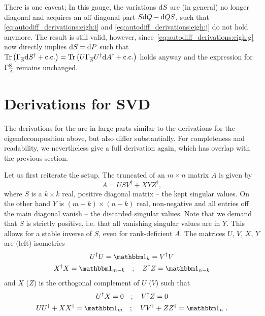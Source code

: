 There is one caveat;
%
In this gauge, the variations $\mathrm{d}{S}$ are (in general) no longer diagonal and acquires an off-diagonal part $S \mathrm{d}{Q} - \mathrm{d}{Q} S$, such that \eqref{eq:autodiff_derivations:eigh:i} and \eqref{eq:autodiff_derivations:eigh:j} do not hold anymore.
%
The result is still valid, however, since~\eqref{eq:autodiff_derivations:eigh:g} now directly implies $\mathrm{d}{S} = \mathrm{d}{P}$ such that $\mathrm{Tr}\left( {\Gamma_{\overline{S}} \mathrm{d}{S}^\dagger + \mathrm{c.c.}} \right) = \mathrm{Tr}\left( {U \Gamma_{\overline{S}} U^\dagger \mathrm{d}{A}^\dagger + \mathrm{c.c.}} \right)$ holds anyway and the expression for $\Gamma_{\overline{A}}^\mathrm{S}$ remains unchanged.

\section{Derivations for SVD}
\label{sec:autodiff_derivation:svd}

The derivations for the  are in large parts similar to the derivations for the eigendecomposition above, but also differ substantially.
%
For completeness and readability, we nevertheless give a full derivation again, which has overlap with the previous section.

Let us first reiterate the setup.
%
The truncated  of an $m \times n$ matrix $A$ is given by
\begin{equation}
    A = U S V^{\dagger} + X Y Z^{\dagger},
    \label{eq:autodiff_derivations:svd_full_decomposition}
\end{equation}
%
where $S$ is a $k \times k$ real, positive diagonal matrix -- the kept singular values.
%
On the other hand $Y$ is $(m - k) \times (n - k)$ real, non-negative and all entries off the main diagonal vanish -- the discarded singular values.
%
Note that we demand that $S$ is strictly positive, i.e. that all vanishing singular values are in $Y$.
%
This allows for a stable inverse of $S$, even for rank-deficient $A$.
%
The matrices $U$, $V$, $X$, $Y$ are (left) isometries
%
\begin{equation}\begin{gathered}
    U^{\dagger} U = \eye_k = V^{\dagger} V
    \\
    X^{\dagger} X = \eye_{m-k}
    \quad ; \quad
    Z^{\dagger} Z = \eye_{n-k}
    \label{eq:autodiff_derivations:isometric_constraints}
\end{gathered}\end{equation}
%
and $X$ ($Z$) is the orthogonal complement of $U$ ($V$) such that
%
\begin{gather}
    U^{\dagger} X = 0
    \quad ; \quad
    V^{\dagger} Z = 0
    \label{eq:autodiff_derivations:UX_VZ_ortho}
    \\
    U U^{\dagger} + X X^{\dagger} = \eye_m
    \quad ; \quad
    V V^{\dagger} + Z Z^{\dagger} = \eye_n
    ~.
    \label{eq:autodiff_derivations:UX_VZ_complete}
\end{gather}

